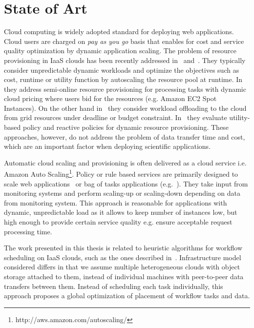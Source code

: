 \chapter{State of Art} \label{chap:state-of-art}  
 
Cloud computing is widely adopted standard for deploying web applications. Cloud users are charged on \emph{pay as you go} basis that enables for cost and service quality optimization by dynamic application scaling. The problem of resource provisioning in IaaS clouds has been recently addressed in~\cite{Chen2011, Kim2011} and~\cite{SqueezingOut}. They typically consider unpredictable dynamic workloads and optimize the objectives such as cost, runtime or utility function by autoscaling the resource pool at runtime. In~\cite{Chen2011} they address semi-online resource provisioning for processing tasks with dynamic cloud pricing where users bid for the resources (e.g. Amazon EC2 Spot Instances).  On the other hand in~\cite{Kim2011} they consider workload offloading to the cloud from grid resources under deadline or budget constraint. In~\cite{SqueezingOut} they evaluate utility-based policy and reactive policies for dynamic resource provisioning. These approaches, however, do not address the problem of data transfer time and cost, which are an important factor when deploying scientific applications.

Automatic cloud scaling and provisioning is often delivered as a cloud service i.e. Amazon Auto Scaling\footnote{http://aws.amazon.com/autoscaling/}. Policy or rule based services are primarily designed to scale web applications~\cite{SqueezingOut} or bag of tasks applications (e.g.~\cite{ElasticSite, Kim2011}). They take input from monitoring systems and perform scaling-up or scaling-down depending on data from monitoring system. This approach is reasonable for applications with dynamic, unpredictable load as it allows to keep number of instances low, but high enough to provide certain service quality e.g. ensure acceptable request processing time.

The work presented in this thesis is related to heuristic algorithms for workflow scheduling on IaaS clouds, such as the ones described in~\cite{Abrishami2013158,Mao11,BarrionuevoFP12,BittencourtM11}. Infrastructure model considered differs in that we assume multiple heterogeneous clouds with object storage attached to them, instead of individual machines with peer-to-peer data transfers between them. Instead of scheduling each task individually, this approach proposes a global optimization of placement of workflow tasks and data.

